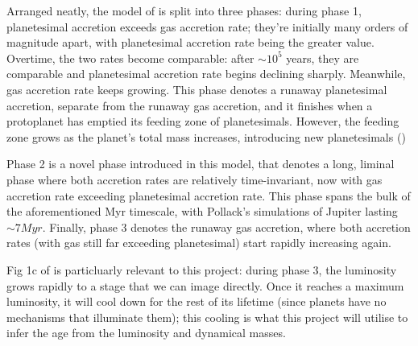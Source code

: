 \documentclass[11pt]{report}
\begin{document}
\begin{mainf}



Arranged neatly, the model of \citealp{Pollack1996} is split into three phases: during phase 1, planetesimal accretion exceeds gas accretion rate;
they're initially many orders of magnitude apart, with planetesimal accretion rate being the greater value. Overtime, the two rates become comparable:
after $\sim 10^5$ years, they are comparable and planetesimal accretion rate begins declining sharply. Meanwhile, gas accretion rate keeps growing.
This phase denotes a runaway planetesimal accretion, separate from the runaway gas accretion, and it finishes when a protoplanet has emptied
its feeding zone of planetesimals. However, the feeding zone grows as the planet's total mass increases, introducing new planetesimals (\citealp{Pollack1996}) 

Phase 2 is a novel phase introduced in this model, that denotes a long, liminal phase where both accretion rates are relatively time-invariant, now with
gas accretion rate exceeding planetesimal accretion rate. This phase spans the bulk of the aforementioned Myr timescale, with Pollack's simulations of Jupiter
lasting $\sim7 Myr$. Finally, phase 3 denotes the runaway gas accretion, where both accretion rates (with gas still far exceeding planetesimal) start rapidly
increasing again.

Fig 1c of \citealp{Pollack1996} is particluarly relevant to this project: during phase 3, the luminosity grows rapidly to a stage that we can image directly.
Once it reaches a maximum luminosity, it will cool down for the rest of its lifetime (since planets have no mechanisms that illuminate them);
this cooling is what this project will utilise to infer the age from the luminosity and dynamical masses.


\end{mainf}
\end{document}
